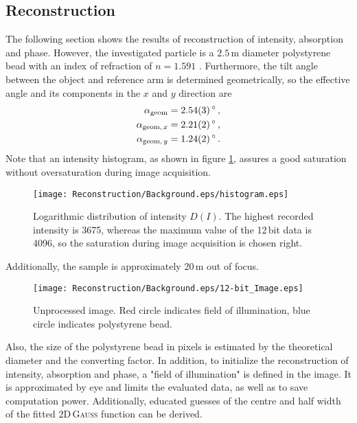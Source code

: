 \documentclass{article}
\begin{document}
\subsection{Reconstruction} \label{results:reconstruction}
The following section shows the results of reconstruction of intensity, absorption and phase. However, the investigated particle is a $2.5\,$\textmu m diameter polystyrene bead with an index of refraction of $n=1.591$ \cite{bead24, bead26}. Furthermore, the tilt angle between the object and reference arm is determined geometrically, so the effective angle and its components in the $x$ and $y$ direction are
\begin{align}
    \alpha_\text{geom}&=2.54(3)\,^\circ\,,\\
    \alpha_{\text{geom,\,}x}&=2.21(2)\,^\circ\,,\\
    \alpha_{\text{geom,\,}y}&=1.24(2)\,^\circ\,.
\end{align}
Note that an intensity histogram, as shown in figure \ref{fig:histogram}, assures a good saturation without oversaturation during image acquisition.
\begin{figure}
    \centering
    \texttt{[image: Reconstruction/Background.eps/histogram.eps]}
    \caption{Logarithmic distribution of intensity $D(I)$.  The highest recorded intensity is 3675,  whereas the maximum value of the 12\,bit data is 4096, so the saturation during image acquisition is chosen right.}
    \label{fig:histogram}
\end{figure}
Additionally, the sample is approximately 20\,\textmu m out of focus.
\begin{figure}
    \centering
    \texttt{[image: Reconstruction/Background.eps/12-bit\_Image.eps]}
    \caption{Unprocessed image. Red circle indicates field of illumination, blue circle indicates polystyrene bead.}
    \label{fig:12bit}
\end{figure}
Also, the size of the polystyrene bead in pixels is estimated by the theoretical diameter and the converting factor. In addition, to initialize the reconstruction of intensity, absorption and phase, a "field of illumination" is defined in the image. It is approximated by eye and limits the evaluated data, as well as to save computation power. Additionally, educated guesses of the centre and half width of the fitted 2D\,\textsc{Gauss} function can be derived.
\end{document}
